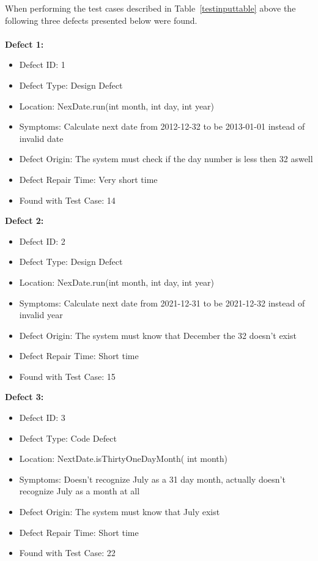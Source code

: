 When performing the test cases described in Table~\ref{testinputtable} above the following three defects presented below were found.\\\\
\noindent\textbf{Defect 1:}
\begin{itemize}
 \item Defect ID: 1
 \item Defect Type: Design Defect
 \item Location: NexDate.run(int month, int day, int year)
 \item Symptoms: Calculate next date from 2012-12-32 to be 2013-01-01 instead of invalid date
 \item Defect Origin: The system must check if the day number is less then 32 aswell
 \item Defect Repair Time: Very short time
 \item Found with Test Case: 14
\end{itemize}

\noindent \textbf{Defect 2:}
\begin{itemize}
 \item Defect ID: 2
 \item Defect Type: Design Defect
 \item Location: NexDate.run(int month, int day, int year)
 \item Symptoms: Calculate next date from 2021-12-31 to be 2021-12-32 instead of invalid year
 \item Defect Origin: The system must know that December the 32 doesn't exist
 \item Defect Repair Time: Short time
 \item Found with Test Case: 15
\end{itemize}

\noindent \textbf{Defect 3:}
\begin{itemize}
 \item Defect ID: 3
 \item Defect Type: Code Defect
 \item Location: NextDate.isThirtyOneDayMonth( int month)
 \item Symptoms: Doesn't recognize July as a 31 day month, actually doesn't recognize July as a month at all
 \item Defect Origin: The system must know that July exist
 \item Defect Repair Time: Short time
 \item Found with Test Case: 22 
\end{itemize}


